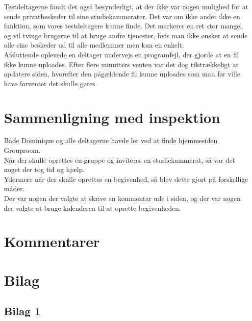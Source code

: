 \documentclass[12pt]{article}
\begin{document}
\newpage

\noindent Testdeltagerne fandt det også besynderligt, at der ikke var nogen mulighed for at sende privatbeskeder til sine studiekammerater. Det var om ikke andet ikke en funktion, som vores testdeltagere kunne finde. Det markerer en ret stor mangel, og vil tvinge brugerne til at bruge andre tjenester, hvis man ikke ønsker at sende alle sine beskeder ud til alle medlemmer men kun en enkelt.\\

\noindent Afsluttende oplevede en deltager undervejs en programfejl, der gjorde at en fil ikke kunne uploades. Efter flere minutters venten var det dog tilstrækkeligt at opdatere siden, hvorefter den pågældende fil kunne uploades som man før ville have forventet det skulle gøres.
\section{Sammenligning med inspektion}

Både Dominique og alle deltagerne havde let ved at finde hjemmesiden Grouproom.\\

Når der skulle oprettes en gruppe og inviteres en studiekammerat, så var det noget der tog tid og hjælp.\\
Ydermere når der skulle oprettes en begivenhed, så blev dette gjort på forskellige måder.\\
Der var nogen der valgte at skrive en kommentar ude i siden, og der var nogen der valgte at bruge kalenderen til at oprette begivenheden.\\


\section{Kommentarer}

\section{Bilag}
\subsection*{Bilag 1}
\end{document}
